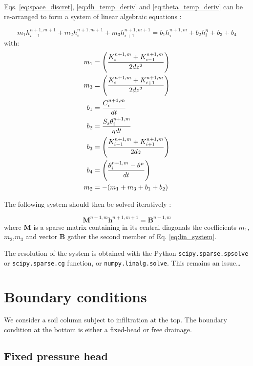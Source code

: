 \documentclass[a4paper,12pt]{article}
\begin{document}
Eqs. \ref{eq:space_discret}, \ref{eq:dh_temp_deriv} and \ref{eq:theta_temp_deriv} can be re-arranged to form a system of linear algebraic equations :

\begin{equation}
    m_1 h_{i-1}^{n+1,m+1} + m_2 h_i^{n+1,m+1} + m_3 h_{i+1}^{n+1,m+1} = b_1 h_i^{n+1,m} + b_2 h_i^n + b_3 + b_4
    \label{eq:lin_system}
\end{equation}
with:
\begin{align}
    m_1 & = \left(\frac{K_i^{n+1,m}+K_{i-1}^{n+1,m}}{2dz^2}\right)  \\
    m_3 & = \left(\frac{K_i^{n+1,m}+K_{i+1}^{n+1,m}}{2dz^2}\right)  \\
    b_1 & = \frac{C_i^{n+1,m}}{dt} \\
    b_2 & = \frac{S_s\theta_i^{n+1,m}}{\eta dt} \\
    b_3 & = \left(\frac{K_{i-1}^{n+1,m}+K_{i+1}^{n+1,m}}{2dz}\right) \\
    b_4 & = \left( { \theta_i^{n+1,m} - \theta^n \over dt} \right) \\
    m_2 & = - ( m_1 + m_3 + b_1 + b_2)
    \label{eq:coefficients}
\end{align}

The following system should then be solved iteratively : 

\begin{equation}
    \mathbf{M}^{n+1,m} \mathbf{h}^{n+1,m+1} = \mathbf{B}^{n+1,m}
    \label{eq:mat_system}
\end{equation}
where $\mathbf{M}$ is a sparse matrix containing in its central diagonals the coefficients $m_1$,$m_2$,$m_3$ and vector $\mathbf{B}$ gather the second member of Eq. \ref{eq:lin_system}. 


The resolution of the system is obtained with the Python \texttt{scipy.sparse.spsolve} or \texttt{scipy.sparse.cg}  function, or \texttt{numpy.linalg.solve}.
This remains an issue\dots

\section{Boundary conditions}

We consider a soil column subject to infiltration at the top. The boundary condition at the bottom is either a fixed-head or free drainage.

\subsection{Fixed pressure head}
\end{document}
